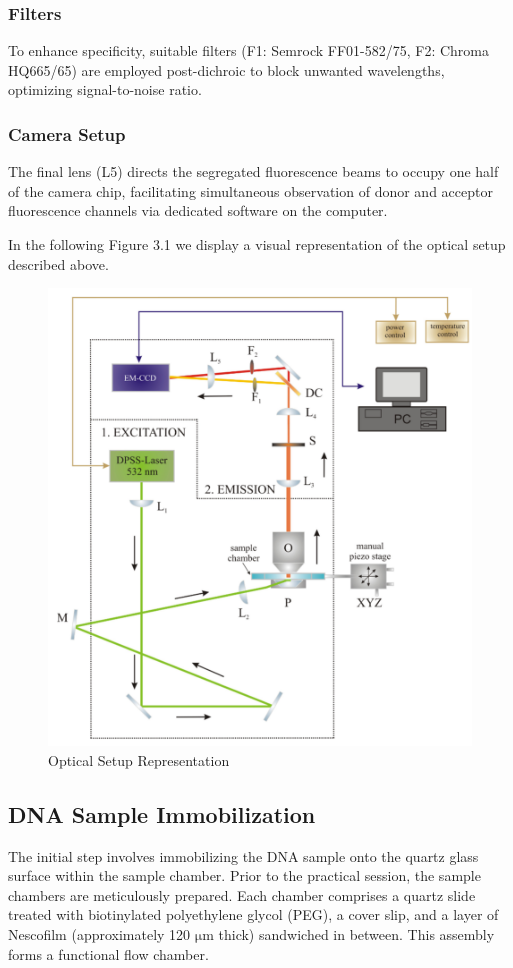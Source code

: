 \documentclass[a4paper,english,12pt,bibliography=totoc]{scrreprt}
\begin{document}
\subsubsection{Filters}
To enhance specificity, suitable filters (F1: Semrock FF01-582/75, F2: Chroma HQ665/65) are employed post-dichroic to block unwanted wavelengths, optimizing signal-to-noise ratio.
\subsubsection{Camera Setup}
The final lens (L5) directs the segregated fluorescence beams to occupy one half of the camera chip, facilitating simultaneous observation of donor and acceptor fluorescence channels via dedicated software on the computer.

In the following Figure 3.1 we display a visual representation of the optical setup described above.

\begin{figure} [H]
    \centering
    \includegraphics[width=0.8\linewidth]{opticalsetup.png}
    \caption{Optical Setup Representation}
    \label{fig:enter-label}
\end{figure}

\subsection{DNA Sample Immobilization}

The initial step involves immobilizing the DNA sample onto the quartz glass surface within the sample chamber. Prior to the practical session, the sample chambers are meticulously prepared. Each chamber comprises a quartz slide treated with biotinylated polyethylene glycol (PEG), a cover slip, and a layer of Nescofilm (approximately 120 $\mathrm{\mu}$m thick) sandwiched in between. This assembly forms a functional flow chamber.
\end{document}
